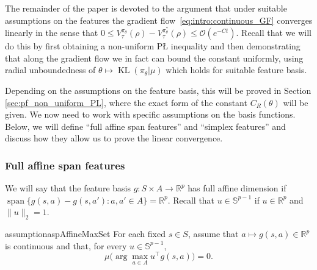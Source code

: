 \documentclass{amsart}
\theoremstyle{definition}
\begin{document}
The remainder of the paper is devoted to the argument that under suitable assumptions on the features the gradient flow~\eqref{eq:intro:continuous_GF} converges linearly in the sense that $0 \leq V_\tau^{\pi_\theta}(\rho) - V_\tau^{\pi_\theta^\ast}(\rho) \leq \mathcal O(e^{-Ct})$.
Recall that we will do this by first obtaining a non-uniform P{\L} inequality and then demonstrating that along the gradient flow we in fact can bound the constant uniformly, using radial unboundedness of $\theta \mapsto \operatorname{KL}(\pi_\theta|\mu)$ which holds for suitable feature basis.

Depending on the assumptions on the feature basis, this will be proved in Section \ref{sec:pf_non_uniform_PL},
where the exact form of the constant $C_R(\theta)$ will be given.
We now need to work with specific assumptions on the basis functions.
Below, we will define ``full affine span features'' and ``simplex features'' and discuss how they allow us to prove the linear convergence.

\subsubsection*{Full affine span features} 
We will say that the feature basis $g:S\times A\to \mathbb R^p$ has full affine dimension if $\operatorname{span}\{g(s,a)-g(s,a'):a,a'\in A \}=\mathbb R^p$.
Recall that $u\in\mathbb S^{p-1}$ if $u\in\mathbb R^p$ and $\|u\|_2 = 1$.

\begin{restatable}[]{assumption}{aspAffineMaxSet}\label{asp:app:mdp:max_set_affine} 
For each fixed
$s\in S$, assume that $a\mapsto g(s,a)\in\mathbb R^p$ is continuous
and that, for every $u\in\mathbb S^{p-1}$,
\[
\mu \Big(\arg\max_{a\in A} u^\top g(s,a)\Big)=0 .
\]
\end{restatable}
\end{document}

